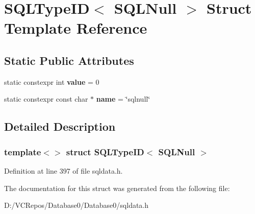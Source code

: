 \hypertarget{struct_s_q_l_type_i_d_3_01_s_q_l_null_01_4}{}\section{S\+Q\+L\+Type\+ID$<$ S\+Q\+L\+Null $>$ Struct Template Reference}
\label{struct_s_q_l_type_i_d_3_01_s_q_l_null_01_4}
\subsection*{Static Public Attributes}
\begin{DoxyCompactItemize}
\item 
\mbox{\label{struct_s_q_l_type_i_d_3_01_s_q_l_null_01_4_a65bf17f161efd2f38e1f9b9f79792eb9}} 
static constexpr int {\bfseries value} = 0
\item 
\mbox{\label{struct_s_q_l_type_i_d_3_01_s_q_l_null_01_4_acc15ac50473cbb3eb5ae11a56dafa1b1}} 
static constexpr const char $\ast$ {\bfseries name} = \char`\"{}sqlnull\char`\"{}
\end{DoxyCompactItemize}


\subsection{Detailed Description}
\subsubsection*{template$<$$>$\newline
struct S\+Q\+L\+Type\+I\+D$<$ S\+Q\+L\+Null $>$}



Definition at line 397 of file sqldata.\+h.



The documentation for this struct was generated from the following file\+:\begin{DoxyCompactItemize}
\item 
D\+:/\+V\+C\+Repos/\+Database0/\+Database0/sqldata.\+h\end{DoxyCompactItemize}

